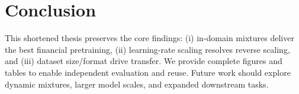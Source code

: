 \chapter{Conclusion}

This shortened thesis preserves the core findings: (i) in-domain mixtures deliver the best financial pretraining, (ii) learning-rate scaling resolves reverse scaling, and (iii) dataset size/format drive transfer. We provide complete figures and tables to enable independent evaluation and reuse. Future work should explore dynamic mixtures, larger model scales, and expanded downstream tasks.

